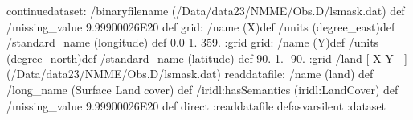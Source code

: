 \begin{ingrid}
continuedataset:
 /binaryfilename (/Data/data23/NMME/Obs.D/lsmask.dat) def
 /missing_value 9.99900026E20 def
grid:
/name (X)def
/units (degree_east)def
/standard_name (longitude) def
 0.0 1. 359.
:grid
grid:
/name (Y)def
/units (degree_north)def
/standard_name (latitude) def
 90. 1. -90.
:grid
 /land{
[ X Y | ] (/Data/data23/NMME/Obs.D/lsmask.dat) readdatafile:
/name (land) def
 /long_name (Surface Land cover) def
/iridl:hasSemantics (iridl:LandCover) def
 /missing_value 9.99900026E20 def
direct
:readdatafile
}defasvarsilent
:dataset


\end{ingrid}
